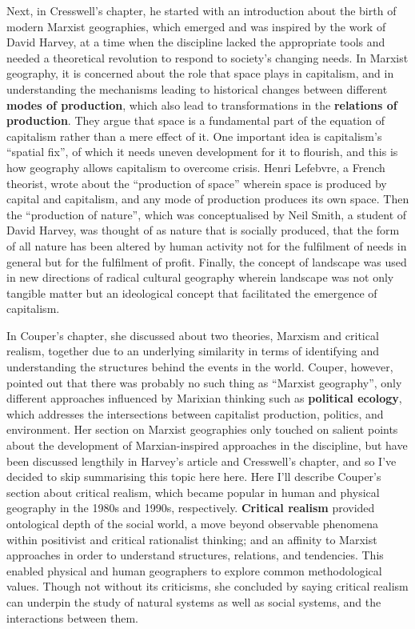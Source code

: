 \documentclass[a4paper, 10.5pt]{article} %
\begin{document}
Next, in Cresswell's chapter, he started with an introduction about the birth of modern Marxist geographies, which emerged and was inspired by the work of David Harvey, at a time when the discipline lacked the appropriate tools and needed a theoretical revolution to respond to society's changing needs. In Marxist geography, it is concerned about the role that space plays in capitalism, and in understanding the mechanisms leading to historical changes between different \textbf{modes of production}, which also lead to transformations in the \textbf{relations of production}. They argue that space is a fundamental part of the equation of capitalism rather than a mere effect of it. One important idea is capitalism's \enquote{spatial fix}, of which it needs uneven development for it to flourish, and this is how geography allows capitalism to overcome crisis. Henri Lefebvre, a French theorist, wrote about the \enquote{production of space} wherein space is produced by capital and capitalism, and any mode of production produces its own space. Then the \enquote{production of nature}, which was conceptualised by Neil Smith, a student of David Harvey, was thought of as nature that is socially produced, that the form of all nature has been altered by human activity not for the fulfilment of needs in general but for the fulfilment of profit. Finally, the concept of landscape was used in new directions of radical cultural geography wherein landscape was not only tangible matter but an ideological concept that facilitated the emergence of capitalism.

In Couper's chapter, she discussed about two theories, Marxism and critical realism, together due to an underlying similarity in terms of identifying and understanding the structures behind the events in the world. Couper, however, pointed out that there was probably no such thing as \enquote{Marxist geography}, only different approaches influenced by Marixian thinking such as \textbf{political ecology}, which addresses the intersections between capitalist production, politics, and environment. Her section on Marxist geographies only touched on salient points about the development of Marxian-inspired approaches in the discipline, but have been discussed lengthily in Harvey's article and Cresswell's chapter, and so I've decided to skip summarising this topic here here. Here I'll describe Couper's section about critical realism, which became popular in human and physical geography in the 1980s and 1990s, respectively. \textbf{Critical realism} provided ontological depth of the social world, a move beyond observable phenomena within positivist and critical rationalist thinking; and an affinity to Marxist approaches in order to understand structures, relations, and tendencies. This enabled physical and human geographers to explore common methodological values. Though not without its criticisms, she concluded by saying critical realism can underpin the study of natural systems as well as social systems, and the interactions between them.
\end{document}
